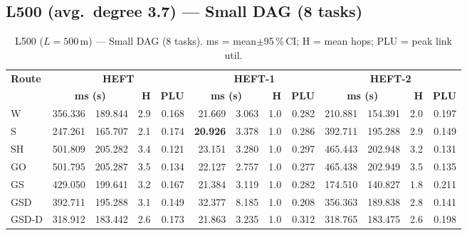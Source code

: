 \documentclass[11pt]{article}
\newcommand{\win}[1]{\textcolor{green!50!black}{\textbf{#1}}}
\newcommand{\bad}[1]{\textcolor{red!70!black}{#1}}
\begin{document}
\subsection{L500 (avg.\ degree 3.7) --- Small DAG (8 tasks)}
\begin{table}[H]\centering\small
\begin{tabular}{l r@{$\pm$}l r r r@{$\pm$}l r r r@{$\pm$}l r r}
\toprule
\textbf{Route} & \multicolumn{4}{c}{\textbf{HEFT}} & \multicolumn{4}{c}{\textbf{HEFT-1}} & \multicolumn{4}{c}{\textbf{HEFT-2}} \\
\cmidrule(lr){2-5}\cmidrule(lr){6-9}\cmidrule(lr){10-13}
& \multicolumn{2}{c}{\textbf{ms (s)}} & \textbf{H} & \textbf{PLU}& \multicolumn{2}{c}{\textbf{ms (s)}} & \textbf{H} & \textbf{PLU}& \multicolumn{2}{c}{\textbf{ms (s)}} & \textbf{H} & \textbf{PLU} \\
\midrule
  W & 356.336 & 189.844 & 2.9 & 0.168 & 21.669 & 3.063 & 1.0 & 0.282 & 210.881 & 154.391 & 2.0 & 0.197 \\
  S & 247.261 & 165.707 & 2.1 & 0.174 & \win{20.926} & 3.378 & 1.0 & 0.286 & 392.711 & 195.288 & 2.9 & 0.149 \\
  SH & \bad{501.809} & 205.282 & 3.4 & 0.121 & 23.151 & 3.280 & 1.0 & 0.297 & \bad{465.443} & 202.948 & 3.2 & 0.131 \\
  GO & \bad{501.795} & 205.287 & 3.5 & 0.134 & 22.127 & 2.757 & 1.0 & 0.277 & \bad{465.438} & 202.949 & 3.5 & 0.135 \\
  GS & 429.050 & 199.641 & 3.2 & 0.167 & 21.384 & 3.119 & 1.0 & 0.282 & 174.510 & 140.827 & 1.8 & 0.211 \\
  GSD & 392.711 & 195.288 & 3.1 & 0.149 & \bad{32.377} & 8.185 & 1.0 & 0.208 & 356.363 & 189.838 & 2.8 & 0.141 \\
  GSD-D & 318.912 & 183.442 & 2.6 & 0.173 & 21.863 & 3.235 & 1.0 & 0.312 & 318.765 & 183.475 & 2.6 & 0.198 \\
\bottomrule\end{tabular}
\caption{L500 ($L=500$\,m) --- Small DAG (8 tasks). ms = mean$\pm$95\,\%\,CI; H = mean hops; PLU = peak link util.}
\end{table}
\end{document}
